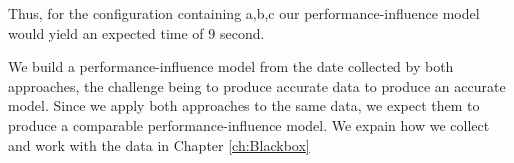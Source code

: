 Thus, for the configuration containing a,b,c our performance-influence model would yield an expected time of 9 second.

We build a performance-influence model from the date collected by both approaches, the challenge being to produce accurate data
to produce an accurate model. Since we apply both approaches to the same data, we expect them to produce a comparable performance-influence model.
We expain how we collect and work with the data in Chapter \ref{ch:Blackbox}%